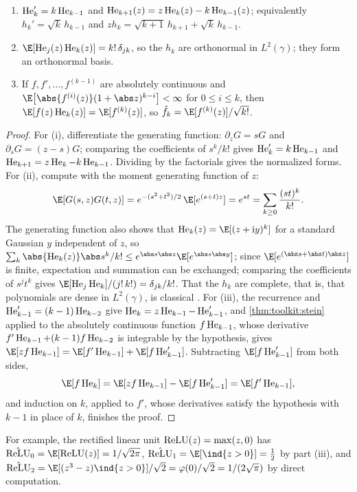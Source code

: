 \begin{refsection}
\begin{lemma}\label{lem:toolkit:hermite}
\begin{enumerate}
\item $\operatorname{He}_k'=k\operatorname{He}_{k-1}$ and $\operatorname{He}_{k+1}(z)=z\operatorname{He}_k(z)-k\operatorname{He}_{k-1}(z)$; equivalently $h_k'=\sqrt k\,h_{k-1}$ and $zh_k=\sqrt{k+1}\,h_{k+1}+\sqrt k\,h_{k-1}$.
\item $\E[\He_j(z)\He_k(z)]=k!\,\delta_{jk}$, so the $h_k$ are orthonormal in $L^2(\gamma)$; they form an orthonormal basis.
\item If $f,f',\dots,f^{(k-1)}$ are absolutely continuous and $\E\big[\abs{f^{(i)}(z)}(1+\abs z)^{k-i}\big]<\infty$ for $0\le i\le k$, then $\E[f(z)\He_k(z)]=\E[f^{(k)}(z)]$, so $\hat f_k=\E[f^{(k)}(z)]/\sqrt{k!}$.
\end{enumerate}
\end{lemma}

\begin{proof}
For (i), differentiate the generating function: $\partial_zG=sG$ and $\partial_sG=(z-s)G$; comparing the coefficients of $s^k/k!$ gives $\operatorname{He}_k'=k\operatorname{He}_{k-1}$ and $\operatorname{He}_{k+1}=z\operatorname{He}_k-k\operatorname{He}_{k-1}$. Dividing by the factorials gives the normalized forms. For (ii), compute with the moment generating function of $z$:
\[
  \E[G(s,z)G(t,z)]=e^{-(s^2+t^2)/2}\,\E[e^{(s+t)z}]=e^{st}=\sum_{k\ge0}\frac{(st)^k}{k!}.
\]
The generating function also shows that $\He_k(z)=\E[(z+\mathrm iy)^k]$ for a standard Gaussian $y$ independent of $z$, so $\sum_k\abs{\He_k(z)}\abs s^k/k!\le e^{\abs s\abs z}\E[e^{\abs s\abs y}]$; since $\E[e^{(\abs s+\abs t)\abs z}]$ is finite, expectation and summation can be exchanged; comparing the coefficients of $s^jt^k$ gives $\E[\He_j\He_k]/(j!\,k!)=\delta_{jk}/k!$. That the $h_k$ are complete, that is, that polynomials are dense in $L^2(\gamma)$, is classical \parencite{Bogachev1998}. For (iii), the recurrence and $\operatorname{He}_{k-1}'=(k-1)\operatorname{He}_{k-2}$ give $\operatorname{He}_k=z\operatorname{He}_{k-1}-\operatorname{He}_{k-1}'$, and \cref{thm:toolkit:stein} applied to the absolutely continuous function $f\operatorname{He}_{k-1}$, whose derivative $f'\operatorname{He}_{k-1}+(k-1)f\operatorname{He}_{k-2}$ is integrable by the hypothesis, gives $\E[zf\He_{k-1}]=\E[f'\He_{k-1}]+\E[f\He_{k-1}']$. Subtracting $\E[f\He_{k-1}']$ from both sides,
\[
  \E[f\He_k]=\E[zf\He_{k-1}]-\E[f\He_{k-1}']=\E[f'\He_{k-1}],
\]
and induction on $k$, applied to $f'$, whose derivatives satisfy the hypothesis with $k-1$ in place of $k$, finishes the proof.
\end{proof}

For example, the rectified linear unit $\operatorname{ReLU}(z)=\max(z,0)$ has $\hat\relu_0=\E[\relu(z)]=1/\sqrt{2\pi}$, $\hat\relu_1=\E[\ind\{z>0\}]=\frac12$ by part (iii), and $\hat\relu_2=\E[(z^3-z)\ind\{z>0\}]/\sqrt2=\varphi(0)/\sqrt2=1/(2\sqrt\pi)$ by direct computation.


\end{refsection}
